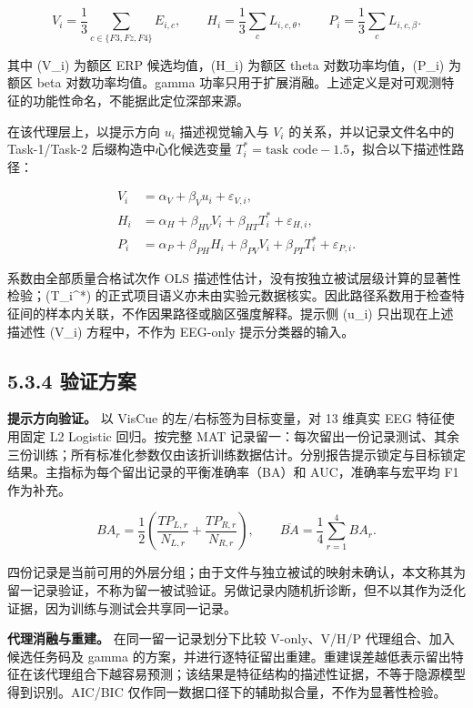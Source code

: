 \documentclass[
]{article}
\begin{document}
\[
V_i=\frac{1}{3}\sum_{c\in\{F3,Fz,F4\}}E_{i,c},\qquad
H_i=\frac{1}{3}\sum_c L_{i,c,\theta},\qquad
P_i=\frac{1}{3}\sum_c L_{i,c,\beta}.
\]

其中 (V\_i) 为额区 ERP 候选均值，(H\_i) 为额区 theta
对数功率均值，(P\_i) 为额区 beta 对数功率均值。gamma
功率只用于扩展消融。上述定义是对可观测特征的功能性命名，不能据此定位深部来源。

在该代理层上，以提示方向 \(u_i\) 描述视觉输入与 \(V_i\)
的关系，并以记录文件名中的 Task-1/Task-2 后缀构造中心化候选变量
\(T_i^*=\text{task code}-1.5\)，拟合以下描述性路径：

\[
\begin{aligned}
V_i &= \alpha_V+\beta_Vu_i+\varepsilon_{V,i},\\
H_i &= \alpha_H+\beta_{HV}V_i+\beta_{HT}T_i^*+\varepsilon_{H,i},\\
P_i &= \alpha_P+\beta_{PH}H_i+\beta_{PV}V_i+\beta_{PT}T_i^*+\varepsilon_{P,i}.
\end{aligned}
\]

系数由全部质量合格试次作 OLS
描述性估计，没有按独立被试层级计算的显著性检验；(T\_i\^{}*)
的正式项目语义亦未由实验元数据核实。因此路径系数用于检查特征间的样本内关联，不作因果路径或脑区强度解释。提示侧
(u\_i) 只出现在上述描述性 (V\_i) 方程中，不作为 EEG-only
提示分类器的输入。

\hypertarget{ux9a8cux8bc1ux65b9ux6848}{%
\subsection{5.3.4 验证方案}\label{ux9a8cux8bc1ux65b9ux6848}}

\textbf{提示方向验证。} 以 VisCue 的左/右标签为目标变量，对 13 维真实
EEG 特征使用固定 L2 Logistic 回归。按完整 MAT
记录留一：每次留出一份记录测试、其余三份训练；所有标准化参数仅由该折训练数据估计。分别报告提示锁定与目标锁定结果。主指标为每个留出记录的平衡准确率（BA）和
AUC，准确率与宏平均 F1 作为补充。

\[
BA_r=\frac{1}{2}\left(\frac{TP_{L,r}}{N_{L,r}}+\frac{TP_{R,r}}{N_{R,r}}\right),\qquad
\overline{BA}=\frac{1}{4}\sum_{r=1}^{4}BA_r.
\]

四份记录是当前可用的外层分组；由于文件与独立被试的映射未确认，本文称其为留一记录验证，不称为留一被试验证。另做记录内随机折诊断，但不以其作为泛化证据，因为训练与测试会共享同一记录。

\textbf{代理消融与重建。} 在同一留一记录划分下比较 V-only、V/H/P
代理组合、加入候选任务码及 gamma
的方案，并进行逐特征留出重建。重建误差越低表示留出特征在该代理组合下越容易预测；该结果是特征结构的描述性证据，不等于隐源模型得到识别。AIC/BIC
仅作同一数据口径下的辅助拟合量，不作为显著性检验。
\end{document}
